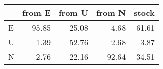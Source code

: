 \begin{tabular}{lrrrr}
\toprule
{} &  from E &  from U &  from N &  stock \\
\midrule
E &   95.85 &   25.08 &    4.68 &  61.61 \\
U &    1.39 &   52.76 &    2.68 &   3.87 \\
N &    2.76 &   22.16 &   92.64 &  34.51 \\
\bottomrule
\end{tabular}
